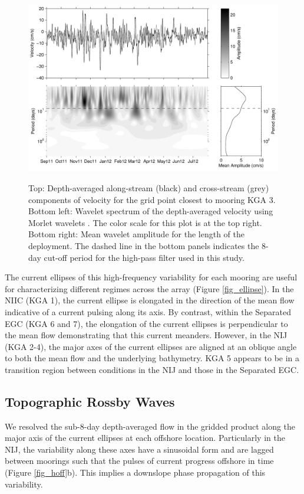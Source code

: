 \documentclass[12pt,titlepage,figuresatend]{article}
\begin{document}
\begin{figure}[ht!]
  \centering\includegraphics[width=\hsize]{./figures/TRWwavelet.pdf}
  \caption{Top: Depth-averaged along-stream (black) and cross-stream (grey) components of velocity for the grid point closest to mooring KGA 3. Bottom left: Wavelet spectrum of the depth-averaged velocity using Morlet wavelets \cite[]{Lilly2017}. The color scale for this plot is at the top right. Bottom right: Mean wavelet amplitude for the length of the deployment. The dashed line in the bottom panels indicates the 8-day cut-off period for the high-pass filter used in this study.}{\label{fig_waveSpec}}
\end{figure}

The current ellipses of this high-frequency variability for each mooring are useful for characterizing different regimes across the array (Figure \ref{fig_ellipse}). In the NIIC (KGA 1), the current ellipse is elongated in the direction of the mean flow indicative of a current pulsing along its axis. By contrast, within the Separated EGC (KGA 6 and 7), the elongation of the current ellipses is perpendicular to the mean flow demonstrating that this current meanders. However, in the NIJ (KGA 2-4), the major axes of the current ellipses are aligned at an oblique angle to both the mean flow and the underlying bathymetry. KGA 5 appears to be in a transition region between conditions in the NIJ and those in the Separated EGC.


\subsection{Topographic Rossby Waves}
\label{TRWsec}

We resolved the sub-8-day depth-averaged flow in the gridded product along the major axis of the current ellipses at each offshore location. Particularly in the NIJ, the variability along these axes have a sinusoidal form and are lagged between moorings such that the pulses of current progress offshore in time (Figure \ref{fig_hoff}b). This implies a downslope phase propagation of this variability.
\end{document}

